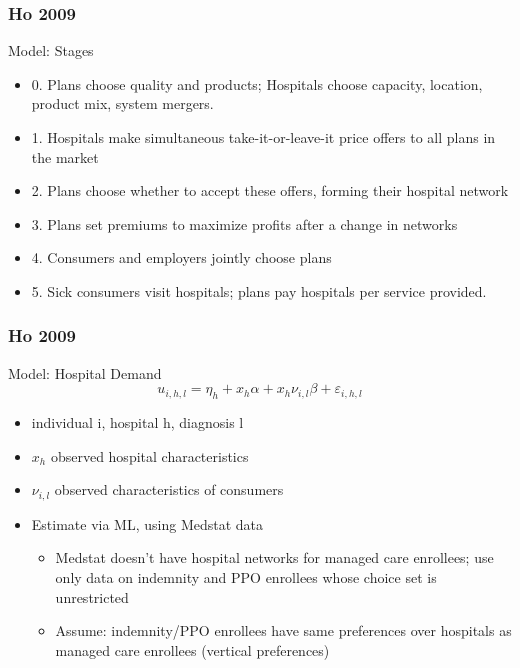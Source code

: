 \begin{frame}
\frametitle{Ho 2009}

Model: Stages
\begin{itemize}
\item 0. Plans choose quality and products; Hospitals choose capacity, location, product mix, system mergers.
\item 1. Hospitals make simultaneous take-it-or-leave-it price offers to all plans in the market
\item 2. Plans choose whether to accept these offers, forming their hospital network
\item 3. Plans set premiums to maximize profits after a change in networks
\item 4. Consumers and employers jointly choose plans
\item 5. Sick consumers visit hospitals; plans pay hospitals per service provided.
\end{itemize}
\end{frame}
\begin{frame}
\frametitle{Ho 2009}

Model: Hospital Demand
\[
u_{i,h,l}=\eta _{h}+x_{h}\alpha +x_{h}\nu _{i,l}\beta +\varepsilon _{i,h,l}
\]

\begin{itemize}
\item individual i, hospital h, diagnosis l
\item $x_{h}$ observed hospital characteristics
\item $\nu_{i,l}$ observed characteristics of consumers
\item Estimate via ML, using Medstat data
\begin{itemize}
\item Medstat doesn't have hospital networks for managed care enrollees; use only data on indemnity and PPO enrollees whose choice set is unrestricted
\item Assume: indemnity/PPO enrollees have same preferences over hospitals as managed care enrollees (vertical preferences)
\end{itemize}
\end{itemize}

\end{frame}

